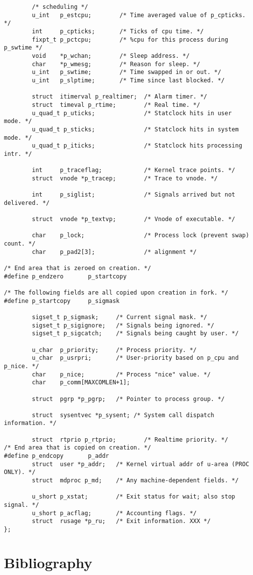 \begin{lstlisting}
        /* scheduling */
        u_int   p_estcpu;        /* Time averaged value of p_cpticks. */
        int     p_cpticks;       /* Ticks of cpu time. */
        fixpt_t p_pctcpu;        /* %cpu for this process during p_swtime */
        void    *p_wchan;        /* Sleep address. */
        char    *p_wmesg;        /* Reason for sleep. */
        u_int   p_swtime;        /* Time swapped in or out. */
        u_int   p_slptime;       /* Time since last blocked. */

        struct  itimerval p_realtimer;  /* Alarm timer. */
        struct  timeval p_rtime;        /* Real time. */
        u_quad_t p_uticks;              /* Statclock hits in user mode. */
        u_quad_t p_sticks;              /* Statclock hits in system mode. */
        u_quad_t p_iticks;              /* Statclock hits processing intr. */

        int     p_traceflag;            /* Kernel trace points. */
        struct  vnode *p_tracep;        /* Trace to vnode. */

        int     p_siglist;              /* Signals arrived but not delivered. */

        struct  vnode *p_textvp;        /* Vnode of executable. */

        char    p_lock;                 /* Process lock (prevent swap) count. */
        char    p_pad2[3];              /* alignment */

/* End area that is zeroed on creation. */
#define p_endzero       p_startcopy

/* The following fields are all copied upon creation in fork. */
#define p_startcopy     p_sigmask

        sigset_t p_sigmask;     /* Current signal mask. */
        sigset_t p_sigignore;   /* Signals being ignored. */
        sigset_t p_sigcatch;    /* Signals being caught by user. */

        u_char  p_priority;     /* Process priority. */
        u_char  p_usrpri;       /* User-priority based on p_cpu and p_nice. */
        char    p_nice;         /* Process "nice" value. */
        char    p_comm[MAXCOMLEN+1];

        struct  pgrp *p_pgrp;   /* Pointer to process group. */

        struct  sysentvec *p_sysent; /* System call dispatch information. */

        struct  rtprio p_rtprio;        /* Realtime priority. */
/* End area that is copied on creation. */
#define p_endcopy       p_addr
        struct  user *p_addr;   /* Kernel virtual addr of u-area (PROC ONLY). */
        struct  mdproc p_md;    /* Any machine-dependent fields. */

        u_short p_xstat;        /* Exit status for wait; also stop signal. */
        u_short p_acflag;       /* Accounting flags. */
        struct  rusage *p_ru;   /* Exit information. XXX */
};
\end{lstlisting}
\section{Bibliography}

% 
% 

% 
